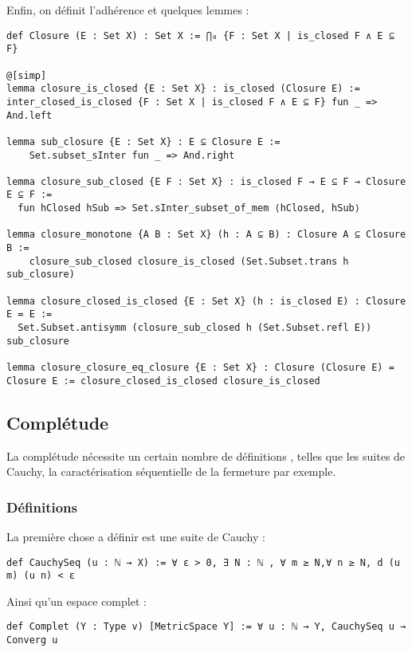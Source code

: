 \documentclass[a4paper, 12pt]{article}
\begin{document}
Enfin, on définit l'adhérence et quelques lemmes :

\begin{verbatim}
def Closure (E : Set X) : Set X := ⋂₀ {F : Set X | is_closed F ∧ E ⊆ F}

@[simp]
lemma closure_is_closed {E : Set X} : is_closed (Closure E) := inter_closed_is_closed {F : Set X | is_closed F ∧ E ⊆ F} fun _ => And.left

lemma sub_closure {E : Set X} : E ⊆ Closure E :=
    Set.subset_sInter fun _ => And.right

lemma closure_sub_closed {E F : Set X} : is_closed F → E ⊆ F → Closure E ⊆ F :=
  fun hClosed hSub => Set.sInter_subset_of_mem ⟨hClosed, hSub⟩

lemma closure_monotone {A B : Set X} (h : A ⊆ B) : Closure A ⊆ Closure B :=
    closure_sub_closed closure_is_closed (Set.Subset.trans h sub_closure)

lemma closure_closed_is_closed {E : Set X} (h : is_closed E) : Closure E = E :=
  Set.Subset.antisymm (closure_sub_closed h (Set.Subset.refl E)) sub_closure

lemma closure_closure_eq_closure {E : Set X} : Closure (Closure E) = Closure E := closure_closed_is_closed closure_is_closed
\end{verbatim}

\subsection{Complétude}

La complétude nécessite un certain nombre de définitions , telles que les suites de Cauchy, la caractérisation séquentielle de la fermeture par exemple.

\subsubsection{Définitions}

La première chose a définir est une suite de Cauchy :

\begin{verbatim}
def CauchySeq (u : ℕ → X) := ∀ ε > 0, ∃ N : ℕ , ∀ m ≥ N,∀ n ≥ N, d (u m) (u n) < ε
\end{verbatim}

Ainsi qu'un espace complet :

\begin{verbatim}
def Complet (Y : Type v) [MetricSpace Y] := ∀ u : ℕ → Y, CauchySeq u → Converg u
\end{verbatim}
\end{document}

